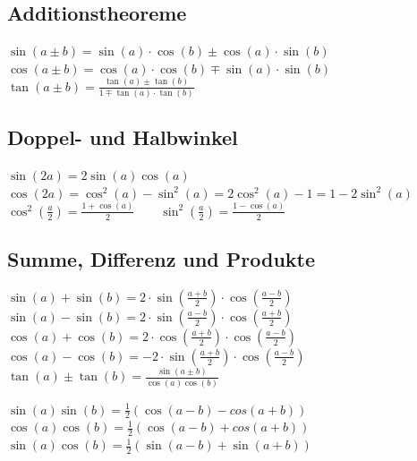 \begin{minipage}{12.5cm}
	\subsection{Additionstheoreme}
		$\sin(a \pm b)=\sin(a) \cdot \cos(b) \pm \cos(a) \cdot \sin(b)$\\
		$\cos(a \pm b)=\cos(a) \cdot \cos(b) \mp \sin(a) \cdot \sin(b)$\\	
		$\tan(a \pm b)=\frac{\tan(a) \pm \tan(b)}{1 \mp \tan(a) \cdot \tan(b)}$
		
	\subsection{Doppel- und Halbwinkel}	
		$\sin(2a)=2\sin(a)\cos(a)$\\
		$\cos(2a)=\cos^2(a)-\sin^2(a)=2\cos^2(a)-1=1-2\sin^2(a)$\\
		$\cos^2 \left(\frac{a}{2}\right)=\frac{1+\cos(a)}{2} \qquad
		\sin^2 \left(\frac{a}{2}\right)=\frac{1-\cos(a)}{2}$ \\ 
	\subsection{Summe, Differenz und Produkte}
	\begin{minipage}{7.5cm}	
		$\sin(a)+\sin(b)=2 \cdot \sin \left(\frac{a+b}{2}\right) \cdot
		\cos\left(\frac{a-b}{2}\right)$\\
		$\sin(a)-\sin(b)=2 \cdot \sin \left(\frac{a-b}{2}\right) \cdot
		\cos\left(\frac{a+b}{2}\right)$\\
		$\cos(a)+\cos(b)=2 \cdot \cos \left(\frac{a+b}{2}\right) \cdot
		\cos\left(\frac{a-b}{2}\right)$\\
		$\cos(a)-\cos(b)=-2 \cdot \sin \left(\frac{a+b}{2}\right) \cdot
		\cos\left(\frac{a-b}{2}\right)$\\
		$\tan(a) \pm \tan(b)=\frac{\sin(a \pm b)}{\cos(a)\cos(b)}$	\\
	\end{minipage}
	\begin{minipage}{6cm}
		$\sin(a)\sin(b)=\frac{1}{2}(\cos(a-b)-cos(a+b))$\\
		$\cos(a)\cos(b)=\frac{1}{2}(\cos(a-b)+cos(a+b))$\\
		$\sin(a)\cos(b)=\frac{1}{2}(\sin(a-b)+\sin(a+b))$\\
	\end{minipage}	
	

\end{minipage}
